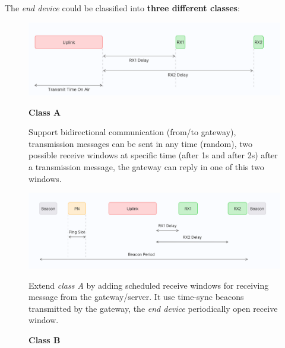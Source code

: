 \newpage
The \textit{end device} could be classified into \textbf{three different classes}:
\begin{figure}[h]
    \centering
    \begin{minipage}[t]{0.45\textwidth}
        \centering
        \includegraphics[width=\textwidth]{img/lora_classA}
        \caption{\textbf{Class A}}

        \begin{flushleft}
            Support bidirectional communication (from/to gateway), transmission messages can be sent in any time (random), two possible receive windows at specific time (after 1s and after 2s) after a transmission message, the gateway can reply in one of this two windows.
        \end{flushleft}
    \end{minipage}
    \begin{minipage}[t]{0.45\textwidth}
        \centering
        \includegraphics[width=\textwidth]{img/lora_classB}
        \caption{\textbf{Class B}}

        \begin{flushleft}
            Extend \textit{class A} by adding scheduled receive windows for receiving message from the gateway/server. It use time-sync beacons transmitted by the gateway, the \textit{end device} periodically open receive window.
        \end{flushleft}
    \end{minipage}
\end{figure}

